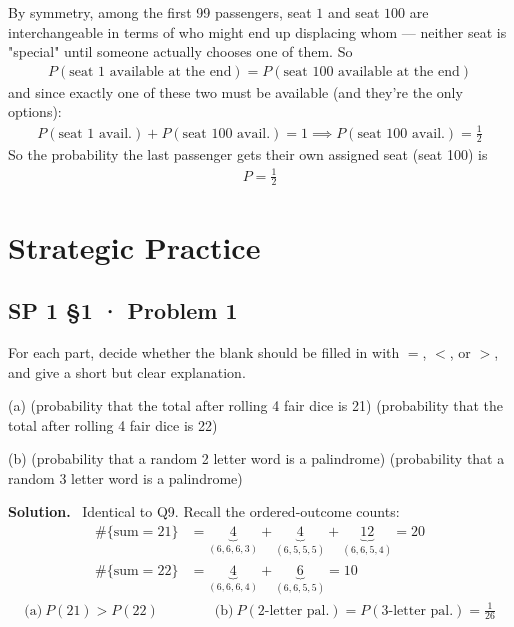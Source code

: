 \documentclass[11pt]{article}
\newcommand{\Sol}{\vspace{2pt}\noindent\textbf{Solution.}\ }
\begin{document}
By symmetry, among the first 99 passengers, seat $1$ and seat $100$ are interchangeable in terms of who might end up displacing whom — neither seat is "special" until someone actually chooses one of them. So
\begin{align*}
P(\text{seat 1 available at the end}) = P(\text{seat 100 available at the end})
\end{align*}
and since exactly one of these two must be available (and they're the only options):
\begin{align*}
P(\text{seat 1 avail.}) + P(\text{seat 100 avail.}) = 1 \implies P(\text{seat 100 avail.}) = \frac12
\end{align*}
So the probability the last passenger gets their own assigned seat (seat 100) is
\begin{align*}
P = \frac12
\end{align*}

\newpage
\section*{Strategic Practice}

\subsection{SP 1 §1 · Problem 1}
\begin{qbox}
For each part, decide whether the blank should be filled in with $=$, $<$, or $>$, and give a short but clear explanation.

(a) (probability that the total after rolling 4 fair dice is 21) \underline{\hspace{1cm}} (probability that the total after rolling 4 fair dice is 22)

(b) (probability that a random 2 letter word is a palindrome) \underline{\hspace{1cm}} (probability that a random 3 letter word is a palindrome)
\end{qbox}
\Sol
Identical to Q9. Recall the ordered-outcome counts:
\begin{align*}
\#\{\text{sum}=21\} &= \underbrace{4}_{(6,6,6,3)}+\underbrace{4}_{(6,5,5,5)}+\underbrace{12}_{(6,6,5,4)} = 20\\
\#\{\text{sum}=22\} &= \underbrace{4}_{(6,6,6,4)}+\underbrace{6}_{(6,6,5,5)} = 10
\end{align*}
\begin{align*}
\text{(a)}\ P(21) > P(22) \qquad\qquad \text{(b)}\ P(\text{2-letter pal.}) = P(\text{3-letter pal.}) = \frac{1}{26}
\end{align*}
\end{document}
